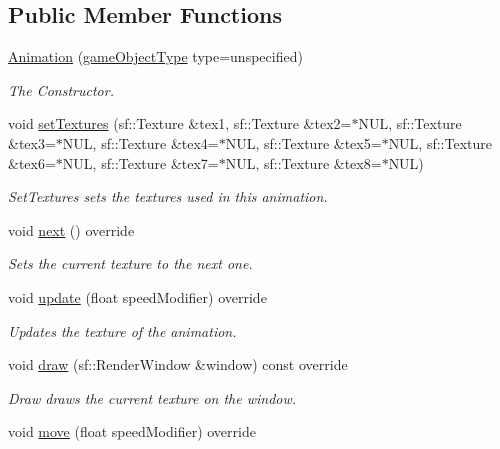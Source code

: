 \subsection*{Public Member Functions}
\begin{DoxyCompactItemize}
\item 
\hyperlink{class_animation_a9bea96e39c72451d91d8c33f48ef194c}{Animation} (\hyperlink{class_game_object_ad5092169e581fb0772e01026882ea0c8}{game\+Object\+Type} type=unspecified)
\begin{DoxyCompactList}\small\item\em The Constructor. \end{DoxyCompactList}\item 
void \hyperlink{class_animation_ab63fd2f5810a27e1b61f43f19e8994c6}{set\+Textures} (sf\+::\+Texture \&tex1, sf\+::\+Texture \&tex2=$\ast$N\+U\+L, sf\+::\+Texture \&tex3=$\ast$N\+U\+L, sf\+::\+Texture \&tex4=$\ast$N\+U\+L, sf\+::\+Texture \&tex5=$\ast$N\+U\+L, sf\+::\+Texture \&tex6=$\ast$N\+U\+L, sf\+::\+Texture \&tex7=$\ast$N\+U\+L, sf\+::\+Texture \&tex8=$\ast$N\+U\+L)
\begin{DoxyCompactList}\small\item\em Set\+Textures sets the textures used in this animation. \end{DoxyCompactList}\item 
void \hyperlink{class_animation_ad85bc33848adb3aa539f560552fa36ba}{next} () override
\begin{DoxyCompactList}\small\item\em Sets the current texture to the next one. \end{DoxyCompactList}\item 
void \hyperlink{class_animation_ae17ebf5f4b47801e460eb63342d858e8}{update} (float speed\+Modifier) override
\begin{DoxyCompactList}\small\item\em Updates the texture of the animation. \end{DoxyCompactList}\item 
void \hyperlink{class_animation_a08a39c329c9c63d8569a1fd103542dda}{draw} (sf\+::\+Render\+Window \&window) const override
\begin{DoxyCompactList}\small\item\em Draw draws the current texture on the window. \end{DoxyCompactList}\item 
void \hyperlink{class_animation_a677d0633c20bcd49eab9513e1d47e20a}{move} (float speed\+Modifier) override

\end{DoxyCompactItemize}
